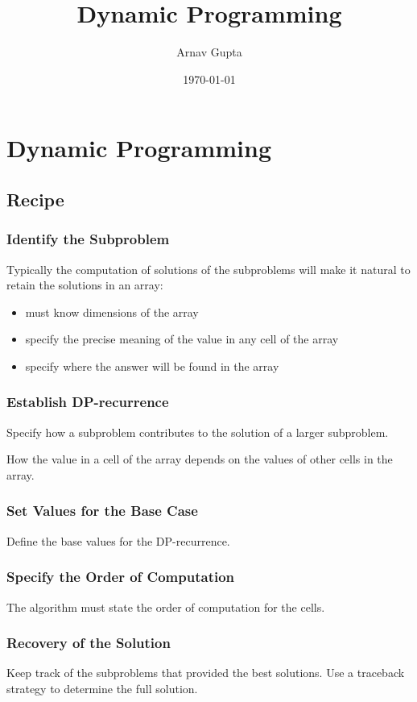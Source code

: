 \documentclass[11pt]{article}
\author{Arnav Gupta}
\date{\today}
\title{Dynamic Programming}
\begin{document}
\maketitle
\tableofcontents

\section{Dynamic Programming}
\label{sec:orgea90bc9}
\subsection{Recipe}
\label{sec:orgaaa312a}
\subsubsection{Identify the Subproblem}
\label{sec:orgce1ada6}
Typically the computation of solutions of the subproblems will make it natural to retain the
solutions in an array:
\begin{itemize}
\item must know dimensions of the array
\item specify the precise meaning of the value in any cell of the array
\item specify where the answer will be found in the array
\end{itemize}
\subsubsection{Establish DP-recurrence}
\label{sec:org3462501}
Specify how a subproblem contributes to the solution of a larger subproblem.

How the value in a cell of the array depends on the values of other cells in the array.
\subsubsection{Set Values for the Base Case}
\label{sec:org470c63e}
Define the base values for the DP-recurrence.
\subsubsection{Specify the Order of Computation}
\label{sec:org846115c}
The algorithm must state the order of computation for the cells.
\subsubsection{Recovery of the Solution}
\label{sec:org70d5907}
Keep track of the subproblems that provided the best solutions.
Use a traceback strategy to determine the full solution.
\end{document}
